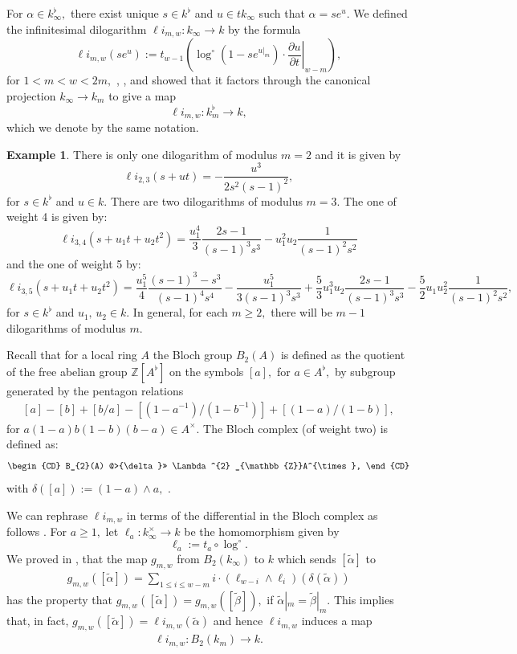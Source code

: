 \documentclass{amsart}
\theoremstyle{definition}
\newtheorem{example}[theorem]{Example}
\numberwithin{equation}{subsection}
\begin{document}
For $\alpha \in k_{\infty}^{\flat},$ there exist unique $s \in k^{\flat}$ and $u \in tk_{\infty}$ such that $\alpha =se^{u}.$  We defined the infinitesimal dilogarithm $\ell i _{m,w}:k_{\infty} \to k$ by the formula
\[
\ell i_{m,w}(se^u) := t_{w-1} \left( \log^\circ(1 - se^{u|_m}) \cdot \left. \frac{\partial u}{\partial t} \right|_{w - m} \right),
\]
for \(1< m < w < 2m, \) \cite[]{inf-dilog}, \cite{u1}, and showed that it factors through the canonical projection $k_{\infty} \to k_{m}$ to give a map \[\ell i_{m,w}:k_{m} ^{\flat} \to k,  \] which we denote by the same notation.   

\begin{example} There is only one dilogarithm of modulus $m=2$ and it is given by 
$$
\ell i _{2,3}(s+ut)= -\frac{u^3}{2s^2(s-1)^2},
$$
for $s \in k^{\flat}$ and $u \in k.$ 
There are two dilogarithms of modulus $m=3.$ The one of weight 4 is given by:  
$$
\ell i _{3,4}(s+u_1t+u_2t^2)=\frac{u_1 ^4}{3}\frac{2s-1}{(s-1)^3 s^3}-u_1^2u_2\frac{1}{(s-1)^2s^2}
$$
and the one of weight 5 by: 
$$
\ell i _{3,5}(s+u_1t+u_2t^2)=\frac{u_1^5}{4}\frac{(s-1)^3-s^3}{(s-1)^4s^4}-\frac{u_1^5}{3(s-1)^3s^3} +\frac{5}{3} u_1^3u_2\frac{2s-1}{(s-1)^3s^3}-\frac{5}{2}u_1u_2^2\frac{1}{(s-1)^2s^2},
$$
for $s \in k^{\flat}$ and $u_1, \,u_2 \in k.$
In general, for each $m \geq 2,$ there will be $m-1$ dilogarithms of modulus $m.$

Recall that for a local ring $A$ the Bloch group $B_{2}(A)$ is defined as the quotient of the free abelian group $\mathbb{Z}[A^{\flat}]$ on the symbols $[a],$ for $a \in A^{\flat},$ by subgroup generated by the pentagon relations
\begin{eqnarray}\label{pentagon}
[a]-[b]+[b/a]-[(1-a^{-1})/(1-b^{-1})]+[(1-a)/(1-b)],
\end{eqnarray}
for $a(1-a)b(1-b)(b-a) \in A^{\times}.$ The Bloch complex (of weight two) is defined as:
\[ 
\begin{CD}
B_{2}(A) @>{\delta}>> \Lambda ^{2} _{\mathbb{Z}}A^{\times},
\end{CD}
\]
with $\delta([a]):=(1-a)\wedge a,$ \cite{geo}.

We can rephrase $\ell i_{m,w}$ in terms of the differential in the Bloch complex as follows \cite[Proposition 3.0.1]{inf-dilog}. For $a \geq 1, $ let $\ell_{a}:k_{\infty}^{\times} \to k$ be the homomorphism given by 
\[
\ell _a:= t_{a} \circ \log ^{\circ}.
\]
We proved in \cite{u1}, that the map $g_{m,w}$  from    $B_{2}(k_{\infty})$ to $k$ which sends $[\tilde{\alpha}]$ to 
\begin{eqnarray}\label{dilog-formula}
 g_{m,w} ([\tilde{\alpha}]) =\sum _{1\leq i \leq w-m} i \cdot (\ell _{w-i} \wedge \ell _{i})(\delta(\tilde{\alpha}))   
\end{eqnarray}
has the property that $g_{m,w}([\tilde{\alpha} ])=g_{m,w}([\tilde{\beta} ]),$ if $\tilde{\alpha}|_{m}=\tilde{\beta}|_{m}.$ This implies that, in fact, $g_{m,w}([\tilde{\alpha}])=\ell i_{m,w}(\tilde{\alpha})$ and hence $\ell i _{m,w}$ induces a map 
\begin{eqnarray}\label{dilog-bloch}
\ell i_{m,w}:B_{2}(k_{m})\to k.
    \end{eqnarray}
  

\end{example}
\end{document}
